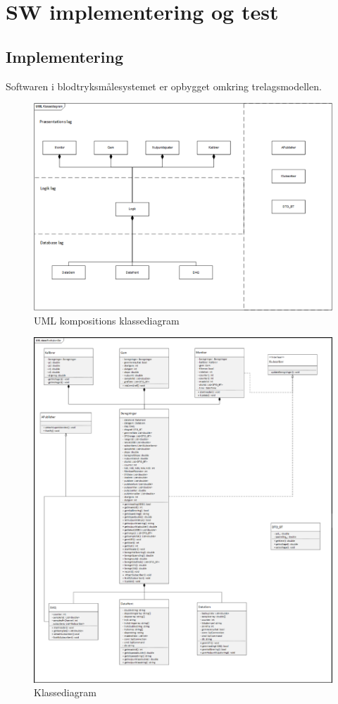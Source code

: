 \chapter{SW implementering og test }

\section{Implementering}
Softwaren i blodtryksmålesystemet er opbygget omkring trelagsmodellen. 

\begin{figure}[H]
	\centering
	\includegraphics[width=1\textwidth]{Figurer/3lagsmodel_software}
	\caption{UML kompositions klassediagram}
\end{figure}

\begin{figure}[H]
	\centering
	\includegraphics[width=1\textwidth]{Figurer/classdiagram}
	\caption{Klassediagram}
\end{figure}

